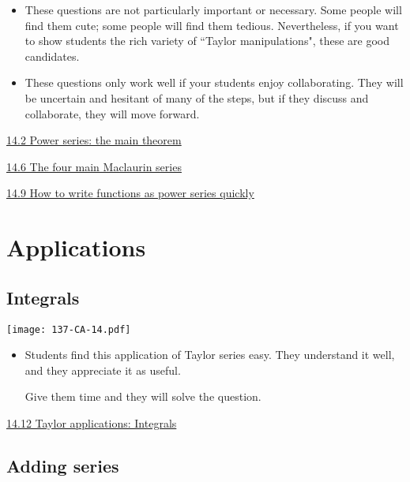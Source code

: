 \documentclass[11pt]{article}
\newcommand{\nl}{\hfill \vspace{-1.1\baselineskip}} %
\newcommand{\vii}{\hspace{8mm}  \href{https://www.youtube.com/watch?v=IEH7d9XiqqA&list=PLlwePzQY_wW9h32ZwS6CYsY4eR_b2pE9j&index=2}{14.2 Power series: the main theorem}}
\newcommand{\vvi}{\hspace{8mm}  \href{https://www.youtube.com/watch?v=o-RSENE_Yus&list=PLlwePzQY_wW9h32ZwS6CYsY4eR_b2pE9j&index=6}{14.6 The four main Maclaurin series}}
\newcommand{\vix}{\hspace{8mm}  \href{https://www.youtube.com/watch?v=ksKu5p2qvB4&list=PLlwePzQY_wW9h32ZwS6CYsY4eR_b2pE9j&index=9}{14.9 How to write functions as power series quickly}}
\newcommand{\vxii}{\hspace{8mm}  \href{https://www.youtube.com/watch?v=4Gbmp8Qn8Xo&list=PLlwePzQY_wW9h32ZwS6CYsY4eR_b2pE9j&index=12}{14.12 Taylor applications: Integrals}}
\begin{document}
\begin{comments}
\nl
	\begin{itemize}
		\item These questions are not particularly important or necessary.  Some people will find them cute; some people will find them tedious.  Nevertheless, if you want to show students the rich variety of ``Taylor manipulations", these are good candidates.
		
		\item These questions only work well if your students enjoy collaborating.    They will be uncertain and hesitant of many of the steps, but if they discuss and collaborate, they will move forward.
	\end{itemize}
\end{comments}

\begin{videos}
\vii

\vvi

\vix
\end{videos}

\newpage
\section{Applications}
\subsection{Integrals}

\begin{center}
{ \texttt{[image: 137-CA-14.pdf]}} 
\end{center}

\begin{comments}
\nl
	\begin{itemize}
		\item  Students find this application of Taylor series easy.  They understand it well, and they appreciate it as useful.

		Give them time and they will solve the question.
	\end{itemize}
\end{comments}

\begin{videos}
\vxii
\end{videos}

\newpage
\subsection{Adding series}
\end{document}
